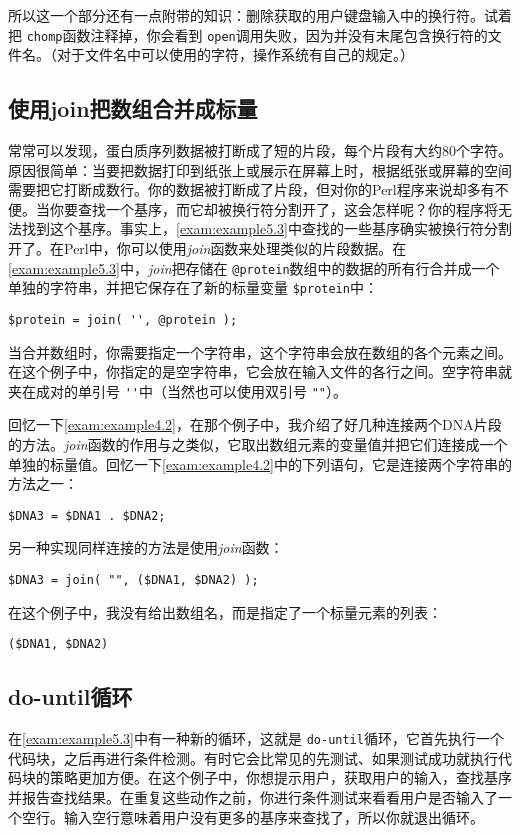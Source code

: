 所以这一个部分还有一点附带的知识：删除获取的用户键盘输入中的换行符。试着把 \verb|chomp|函数注释掉，你会看到 \verb|open|调用失败，因为并没有末尾包含换行符的文件名。（对于文件名中可以使用的字符，操作系统有自己的规定。）

\subsection{使用join把数组合并成标量}
\label{sect:section5.3.2}
常常可以发现，蛋白质序列数据被打断成了短的片段，每个片段有大约80个字符。原因很简单：当要把数据打印到纸张上或展示在屏幕上时，根据纸张或屏幕的空间需要把它打断成数行。你的数据被打断成了片段，但对你的Perl程序来说却多有不便。当你要查找一个基序，而它却被换行符分割开了，这会怎样呢？你的程序将无法找到这个基序。事实上，\autoref{exam:example5.3}中查找的一些基序确实被换行符分割开了。在Perl中，你可以使用\textit{join}函数来处理类似的片段数据。在\autoref{exam:example5.3}中，\textit{join}把存储在 \verb|@protein|数组中的数据的所有行合并成一个单独的字符串，并把它保存在了新的标量变量 \verb|$protein|中：

\begin{lstlisting}
$protein = join( '', @protein );
\end{lstlisting}

当合并数组时，你需要指定一个字符串，这个字符串会放在数组的各个元素之间。在这个例子中，你指定的是空字符串，它会放在输入文件的各行之间。空字符串就夹在成对的单引号 \verb|''|中（当然也可以使用双引号 \verb|""|）。

回忆一下\autoref{exam:example4.2}，在那个例子中，我介绍了好几种连接两个DNA片段的方法。\textit{join}函数的作用与之类似，它取出数组元素的变量值并把它们连接成一个单独的标量值。回忆一下\autoref{exam:example4.2}中的下列语句，它是连接两个字符串的方法之一：

\begin{lstlisting}
$DNA3 = $DNA1 . $DNA2;
\end{lstlisting}

另一种实现同样连接的方法是使用\textit{join}函数：

\begin{lstlisting}
$DNA3 = join( "", ($DNA1, $DNA2) );
\end{lstlisting}

在这个例子中，我没有给出数组名，而是指定了一个标量元素的列表：

\begin{lstlisting}
($DNA1, $DNA2)
\end{lstlisting}

\subsection{do-until循环}
在\autoref{exam:example5.3}中有一种新的循环，这就是 \verb|do-until|循环，它首先执行一个代码块，之后再进行条件检测。有时它会比常见的先测试、如果测试成功就执行代码块的策略更加方便。在这个例子中，你想提示用户，获取用户的输入，查找基序并报告查找结果。在重复这些动作之前，你进行条件测试来看看用户是否输入了一个空行。输入空行意味着用户没有更多的基序来查找了，所以你就退出循环。


